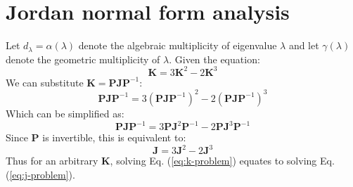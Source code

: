 \documentclass{article}
\theoremstyle{plain}
\theoremstyle{definition}
\theoremstyle{remark}
\newcommand{\vJ}{\mathbf{J}}
\newcommand{\vK}{\mathbf{K}}
\newcommand{\vP}{\mathbf{P}}
\begin{document}
\newpage
\section{Jordan normal form analysis}
\label{app:jordan}
Let $d_\lambda = \alpha(\lambda)$ denote the algebraic multiplicity of eigenvalue $\lambda$ and let $\gamma(\lambda)$ denote the geometric multiplicity of $\lambda$. Given the equation:
\begin{equation}
    \vK = 3\vK^2 - 2\vK^3
    \label{eq:k-problem}
\end{equation}
We can substitute $\vK = \vP\vJ\vP^{-1}$:
\begin{equation*}
    \vP\vJ\vP^{-1} = 3(\vP\vJ\vP^{-1})^2 - 2(\vP\vJ\vP^{-1})^3
\end{equation*}
Which can be simplified as:
\begin{equation*}
    \vP\vJ\vP^{-1} = 3\vP\vJ^2\vP^{-1} - 2\vP\vJ^3\vP^{-1}
\end{equation*}
Since $\vP$ is invertible, this is equivalent to:
\begin{equation}
    \vJ = 3\vJ^2 - 2\vJ^3
    \label{eq:j-problem}
\end{equation}
Thus for an arbitrary $\vK$, solving Eq. (\ref{eq:k-problem}) equates to solving Eq. (\ref{eq:j-problem}).
\end{document}
